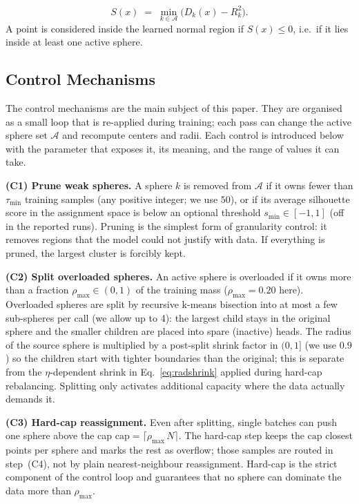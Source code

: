 \documentclass[conference]{IEEEtran}
\begin{document}
\begin{equation}
S(x) \;=\; \min_{k\in\mathcal{A}}\bigl(D_{k}(x)-R_{k}^{2}\bigr).
\label{eq:union}
\end{equation}
A point is considered inside the learned normal region if \(S(x)\le 0\), i.e.\ if it lies inside at least one active sphere.

\subsection{Control Mechanisms}
\label{sec:control}
The control mechanisms are the main subject of this paper. They are organised as a small loop that is re-applied during training; each pass can change the active sphere set \(\mathcal{A}\) and recompute centers and radii. Each control is introduced below with the parameter that exposes it, its meaning, and the range of values it can take.

\textbf{(C1) Prune weak spheres.} A sphere \(k\) is removed from \(\mathcal{A}\) if it owns fewer than \(\tau_{\min}\) training samples (any positive integer; we use \(50\)), or if its average silhouette score \cite{rousseeuw1987silhouettes} in the assignment space is below an optional threshold \(s_{\min}\!\in\![-1,1]\) (off in the reported runs). Pruning is the simplest form of granularity control: it removes regions that the model could not justify with data. If everything is pruned, the largest cluster is forcibly kept.

\textbf{(C2) Split overloaded spheres.} An active sphere is overloaded if it owns more than a fraction \(\rho_{\max}\!\in\!(0,1)\) of the training mass (\(\rho_{\max}\!=\!0.20\) here). Overloaded spheres are split by recursive k-means bisection \cite{steinbach2000comparison} into at most a few sub-spheres per call (we allow up to 4): the largest child stays in the original sphere and the smaller children are placed into spare (inactive) heads. The radius of the source sphere is multiplied by a post-split shrink factor in \((0,1]\) (we use \(0.9\)) so the children start with tighter boundaries than the original; this is separate from the \(\eta\)-dependent shrink in Eq.~\eqref{eq:radshrink} applied during hard-cap rebalancing. Splitting only activates additional capacity where the data actually demands it.

\textbf{(C3) Hard-cap reassignment.} Even after splitting, single batches can push one sphere above the cap \(\mathrm{cap}\!=\!\lceil\rho_{\max}\,N\rceil\). The hard-cap step keeps the \(\mathrm{cap}\) closest points per sphere and marks the rest as overflow; those samples are routed in step~(C4), not by plain nearest-neighbour reassignment. Hard-cap is the strict component of the control loop and guarantees that no sphere can dominate the data more than \(\rho_{\max}\).
\end{document}
